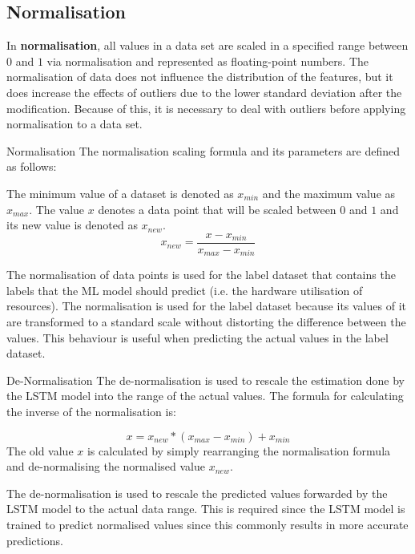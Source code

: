   \subsection{Normalisation}
  \label{sec:data-normalisation-data-preprocessing-architecture}

    In \textbf{normalisation}, all values in a data set are scaled in a specified range between $0$ and $1$ via normalisation and represented as floating-point numbers.
    The normalisation of data does not influence the distribution of the features, but it does increase the effects of outliers due to the lower standard deviation after the modification. Because of this, it is necessary to deal with outliers before applying normalisation to a data set.
    
    \begin{pabox}{Normalisation}
      \label{def:normalisation}
      The normalisation scaling formula and its parameters are defined as follows:

      The minimum value of a dataset is denoted as $x_{min}$ and the maximum value as $x_{max}$.
      The value $x$ denotes a data point that will be scaled between $0$ and $1$ and its new value is denoted as $x_{new}$.
      $$x_{new} = \frac{x - x_{min}}{x_{max} - x_{min}}$$

      
    \end{pabox}
    The normalisation of data points is used for the label dataset that contains the labels that the ML model should predict (i.e. the hardware utilisation of resources). The normalisation is used for the label dataset because its values of it are transformed to a standard scale without distorting the difference between the values. This behaviour is useful when predicting the actual values in the label dataset.

    \begin{pabox}{De-Normalisation}
      The de-normalisation is used to rescale the estimation done by the LSTM model into the range of the actual values. The formula for calculating the inverse of the normalisation is:

      $$x = x_{new} * (x_{max} - x_{min}) + x_{min}$$
      The old value $x$ is calculated by simply rearranging the normalisation formula and de-normalising the normalised value $x_{new}$.
    \end{pabox}
    The de-normalisation is used to rescale the predicted values forwarded by the LSTM model to the actual data range.
    This is required since the LSTM model is trained to predict normalised values since this commonly results in more accurate predictions.
  
